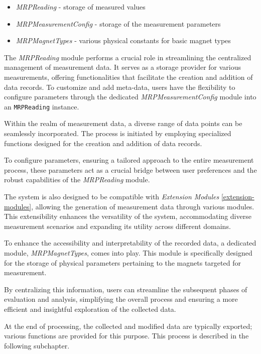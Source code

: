 \begin{itemize}
\tightlist
\item
  \emph{MRPReading} - storage of measured values
\item
  \emph{MRPMeasurementConfig} - storage of the measurement parameters
\item
  \emph{MRPMagnetTypes} - various physical constants for basic magnet
  types
\end{itemize}

The \emph{MRPReading} module performs a crucial role in streamlining the
centralized management of measurement data. It serves as a storage
provider for various measurements, offering functionalities that
facilitate the creation and addition of data records. To customize and
add meta-data, users have the flexibility to configure parameters
through the dedicated \emph{MRPMeasurementConfig} module into an
\passthrough{\lstinline!MRPReading!} instance.

Within the realm of measurement data, a diverse range of data points can
be seamlessly incorporated. The process is initiated by employing
specialized functions designed for the creation and addition of data
records.

To configure parameters, ensuring a tailored approach to the entire
measurement process, these parameters act as a crucial bridge between
user preferences and the robust capabilities of the \emph{MRPReading}
module.

The system is also designed to be compatible with \emph{Extension
Modules} \ref{extension-modules}, allowing the generation of measurement
data through various modules. This extensibility enhances the
versatility of the system, accommodating diverse measurement scenarios
and expanding its utility across different domains.

To enhance the accessibility and interpretability of the recorded data,
a dedicated module, \emph{MRPMagnetTypes}, comes into play. This module
is specifically designed for the storage of physical parameters
pertaining to the magnets targeted for measurement.

By centralizing this information, users can streamline the subsequent
phases of evaluation and analysis, simplifying the overall process and
ensuring a more efficient and insightful exploration of the collected
data.

At the end of processing, the collected and modified data are typically
exported; various functions are provided for this purpose. This process
is described in the following subchapter.

